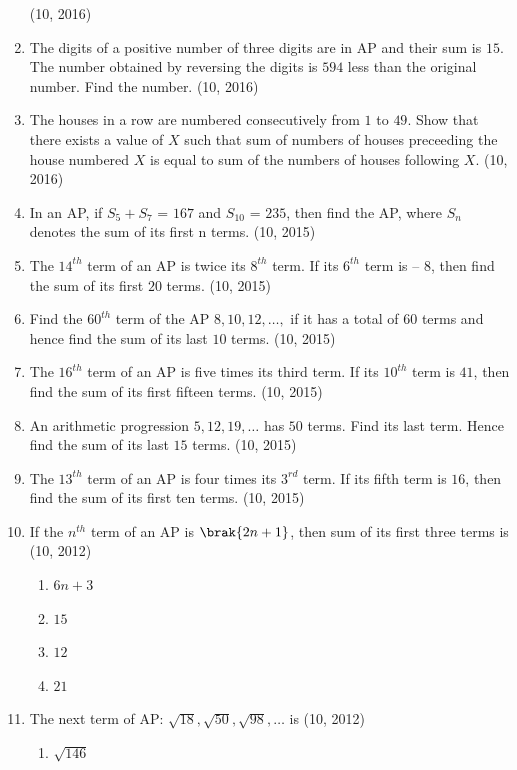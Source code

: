 \begin{enumerate}[label=\thesubsection.\arabic*,ref=\thesubsection.\theenumi,itemsep=1pt]
\hfill (10, 2016) \item The digits of a positive number of three digits are in AP and their sum is $15$. The number obtained by reversing the digits is $594$ less than the original number. Find the number.
\hfill (10, 2016) \item The houses in a row are numbered consecutively from $1$ to $49$. Show that there exists a value of $X$ such that sum of numbers of houses preceeding the house numbered $X$ is equal to sum of the numbers of houses following $X$.
\hfill (10, 2016)
 \item In an AP, if $S_5 + S_7$ = $167$ and $S_10$ = $235$, then find the AP, where $S_n$ denotes the sum of its first n terms.
\hfill (10, 2015) \item The $14^{th}$ term of an AP is twice its $8^{th}$ term. If its $6^{th}$ term is – $8$, then find the sum of its first $20$ terms.
\hfill (10, 2015) \item Find the $60^{th}$ term of the AP $8, 10,  12,  \dots ,$ if it has a total of 60 terms and hence find the sum of its last $10$ terms.
\hfill (10, 2015) \item The $16^{th}$ term of an {AP} is five times its third term. If its $10^{th}$ term is $41$, then find the sum of its first fifteen terms.
\hfill (10, 2015)
 \item An arithmetic progression $5, 12, 19,  \dots $ has $50$ terms. Find its last term. Hence find the sum of its last $15$ terms.
%
\hfill (10, 2015) \item The $13^{th}$ term of an AP is four times its $3^{rd}$ term. If its fifth term is $16$, then find the sum of its first ten terms.
\hfill (10, 2015)
 \item If the $n^{th}$ term of an AP is $\brak{2n+1}$, then sum of its first three terms is 
\hfill (10, 2012)
\begin{multicols}{4}
\begin{enumerate}
 \item $6n + 3$ 
 \item $15$ 
 \item $12$ 
 \item $21$ 
\end{enumerate}
\end{multicols}
 \item The next term of AP: $\sqrt {18}, \sqrt {50}, \sqrt {98}, \dots$ is \hfill (10, 2012)
\begin{multicols}{4}
\begin{enumerate}
 \item $\sqrt {146}$ 

\end{enumerate}
\end{multicols}
\end{enumerate}
